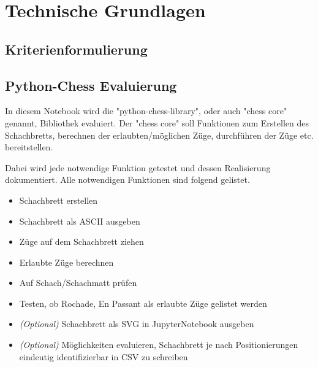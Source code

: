 
\chapter{Technische Grundlagen}

\section{Kriterienformulierung}\label{kriterienformulierung}

\section{Python-Chess Evaluierung}\label{python-chess-evaluierung}

In diesem Notebook wird die "python-chess-library", oder auch "chess
core" genannt, Bibliothek evaluiert. Der "chess core" soll Funktionen
zum Erstellen des Schachbretts, berechnen der erlaubten/möglichen Züge,
durchführen der Züge etc. bereitstellen.

Dabei wird jede notwendige Funktion getestet und dessen Realisierung
dokumentiert. Alle notwendigen Funktionen sind folgend gelistet.

\begin{itemize}
\tightlist
\item
  Schachbrett erstellen
\item
  Schachbrett als ASCII ausgeben
\item
  Züge auf dem Schachbrett ziehen
\item
  Erlaubte Züge berechnen
\item
  Auf Schach/Schachmatt prüfen
\item
  Testen, ob Rochade, En Passant als erlaubte Züge gelistet werden
\item
  \emph{(Optional)} Schachbrett als SVG in JupyterNotebook ausgeben
\item
  \emph{(Optional)} Möglichkeiten evaluieren, Schachbrett je nach
  Positionierungen eindeutig identifizierbar in CSV zu schreiben
\end{itemize}

